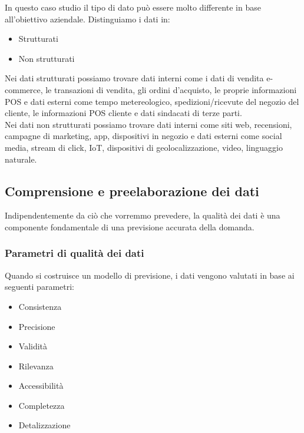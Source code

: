 \documentclass[12pt,a4paper]{report}
\begin{document}
In questo caso studio il tipo di dato può essere molto differente in base all'obiettivo aziendale. Distinguiamo i dati in:
\begin{itemize}
    \item Strutturati
    \item Non strutturati
\end{itemize}

Nei dati strutturati possiamo trovare dati interni come i dati di vendita e-commerce, le transazioni di vendita, gli ordini d'acquisto, le proprie informazioni POS e dati esterni come tempo metereologico, spedizioni/ricevute del negozio del cliente, le informazioni POS cliente e dati sindacati di terze parti.\\
Nei dati non strutturati possiamo trovare dati interni come siti web, recensioni, campagne di marketing, app, dispositivi in negozio e dati esterni come social media, stream di click, IoT, dispositivi di geolocalizzazione, video, linguaggio naturale.\\

\subsection{Comprensione e preelaborazione dei dati}
Indipendentemente da ciò che vorremmo prevedere, la qualità dei dati è una componente fondamentale di una previsione accurata della domanda.

\subsubsection{Parametri di qualità dei dati}
Quando si costruisce un modello di previsione, i dati vengono valutati in base ai seguenti parametri:
\begin{itemize}
    \item Consistenza
    \item Precisione
    \item Validità
    \item Rilevanza
    \item Accessibilità
    \item Completezza
    \item Detalizzazione
\end{itemize}
\end{document}
